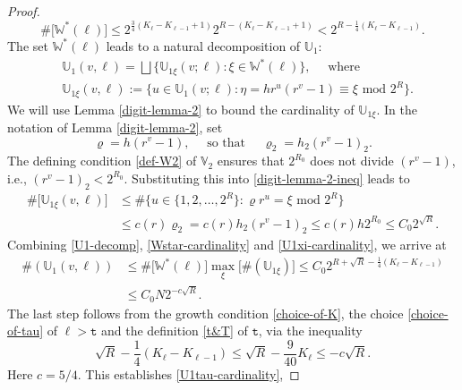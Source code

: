 \documentclass[12pt, twoside]{article}
\theoremstyle{definition}
\numberwithin{equation}{section}
\begin{document}
\begin{proof}
\begin{equation}  
\# \bigl[\mathbb W^{\ast}(\ell) \bigr] \leq 2^{\frac{3}{4} (K_{\ell} - K_{\ell-1}+1)} 2^{R - (K_\ell - K_{\ell-1} + 1)} < 2^{R - \frac{1}{4}(K_{\ell} - K_{\ell-1})}.   \label{Wstar-cardinality} 
\end{equation}   
The set $\mathbb W^{\ast}(\ell)$ leads to a natural decomposition of $\mathbb U_1$:  
\begin{align} 
&\mathbb U_1(v, \ell) = \bigsqcup \bigl\{ \mathbb U_{1 \xi}(v; \ell) : \xi \in \mathbb W^{\ast}(\ell) \bigr\}, \quad \text{ where } \label{U1-decomp} \\ &\mathbb U_{1 \xi}(v, \ell) := \bigl\{u \in \mathbb U_1(v;\ell): \eta = hr^{u}(r^v-1) \equiv \xi \text{ mod } 2^R \bigr\}. \nonumber
\end{align} 
We will use Lemma \ref{digit-lemma-2} to bound the cardinality of $\mathbb U_{1\xi}$. In the notation of Lemma \ref{digit-lemma-2}, set
\[ \varrho = h(r^v-1), \quad \text{ so that } \quad \varrho_2 = h_2 (r^v-1)_2.  \] 
The defining condition \eqref{def-W2} of $\mathbb V_2$ ensures that $2^{R_0}$ does not divide $(r^v-1)$, i.e., $(r^v-1)_2 < 2^{R_0}$.  Substituting this into \eqref{digit-lemma-2-ineq} leads to 
\begin{align} 
\# \bigl[ \mathbb U_{1\xi}(v, \ell)\bigr] &\leq \# \bigl\{u \in \{1, 2, \ldots, 2^{R}\}: \varrho r^u = \xi \text{ mod } 2^R \bigr\}  \nonumber \\
&\leq c(r) \varrho_2 = c(r) h_2 (r^v-1)_2 \leq c(r) h 2^{R_0} \leq C_0 2^{\sqrt{R}}. \label{U1xi-cardinality} 
\end{align} 
Combining \eqref{U1-decomp}, \eqref{Wstar-cardinality} and \eqref{U1xi-cardinality}, we arrive at 
\begin{align*} 
\#(\mathbb U_1(v, \ell)) &\leq \#\bigl[\mathbb W^{\ast} (\ell) \bigr] \max_{\xi} \bigl[ \#(\mathbb U_{1\xi}) \bigr] \leq C_0 2^{R + \sqrt{R} - \frac{1}{4}(K_{\ell} - K_{\ell-1})} \\
&\leq C_0 N 2^{- c \sqrt{R}}.   
\end{align*}   
The last step follows from the growth condition \eqref{choice-of-K}, the choice \eqref{choice-of-tau} of $\ell > \mathtt t$ and the definition \eqref{t&T} of $\mathtt t$, via the inequality 
\[ \sqrt{R} - \frac{1}{4}(K_{\ell} - K_{\ell-1}) \leq  \sqrt{R} - \frac{9}{40}K_{\ell} \leq - c \sqrt{R}. \]  
Here $c = 5/4$. This establishes \eqref{U1tau-cardinality}, 
\end{proof} 
\end{document}
